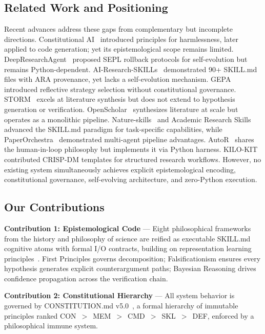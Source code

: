 \documentclass[review]{elsarticle}
\begin{document}
\subsection{Related Work and Positioning}
\label{sec:related}

Recent advances address these gaps from complementary but incomplete directions. Constitutional AI~\cite{bai2022constitutional} introduced principles for harmlessness, later applied to code generation; yet its epistemological scope remains limited. DeepResearchAgent~\cite{skyworkai2026deep} proposed SEPL rollback protocols for self-evolution but remains Python-dependent. AI-Research-SKILLs~\cite{orchestra2026airesearch} demonstrated 90+ SKILL.md files with ARA provenance, yet lacks a self-evolution mechanism. GEPA~\cite{gepa2025gepa} introduced reflective strategy selection without constitutional governance. STORM~\cite{shao2024storm} excels at literature synthesis but does not extend to hypothesis generation or verification. OpenScholar~\cite{asai2025openscholar} synthesizes literature at scale but operates as a monolithic pipeline. Nature-skills~\cite{yuan2025nature} and Academic Research Skills~\cite{ars2025academic} advanced the SKILL.md paradigm for task-specific capabilities, while PaperOrchestra~\cite{song2026paperorchestra} demonstrated multi-agent pipeline advantages. AutoR~\cite{autox2025autor} shares the human-in-loop philosophy but implements it via Python harness. KILO-KIT~\cite{vo2025kilo} contributed CRISP-DM templates for structured research workflows. However, no existing system simultaneously achieves explicit epistemological encoding, constitutional governance, self-evolving architecture, and zero-Python execution.

\subsection{Our Contributions}
\label{sec:contributions}

\textbf{Contribution 1: Epistemological Code} --- Eight philosophical frameworks from the history and philosophy of science are reified as executable SKILL.md cognitive atoms with formal I/O contracts, building on representation learning principles~\cite{bengio2013representation}. First Principles governs decomposition; Falsificationism ensures every hypothesis generates explicit counterargument paths; Bayesian Reasoning drives confidence propagation across the verification chain.

\textbf{Contribution 2: Constitutional Hierarchy} --- All system behavior is governed by CONSTITUTION.md v5.0~\cite{yang2026synthosconst}, a formal hierarchy of immutable principles ranked CON~$>$~MEM~$>$~CMD~$>$~SKL~$>$~DEF, enforced by a philosophical immune system.
\end{document}
